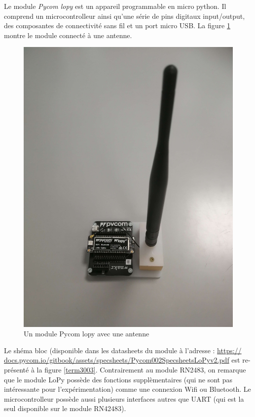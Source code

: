 Le module \textit{Pycom lopy}\cite{sitepycom} est un appareil programmable en micro python. Il comprend un microcontrolleur ainsi qu'une série de pins digitaux input/output,  des composantes de connectivité sans fil et un port micro USB. La figure \ref{term35} montre le module  connecté à une antenne.

\newpage

\begin{figure}[h]
\centering

\includegraphics[scale=0.08]{images/lopy.png}
\caption{Un module Pycom lopy avec une antenne}\label{term35}
\end{figure}


Le shéma bloc (disponible dans les datasheets du module à l'adresse : \href{https://docs.pycom.io/gitbook/assets/specsheets/Pycom_002_Specsheets_LoPy_v2.pdf}{https://
docs.pycom.io/gitbook/assets/specsheets/Pycom002SpecsheetsLoPyv2.pdf} est re-
présenté à la figure \ref{term3003}. Contrairement au module RN2483, on remarque que le module LoPy possède des fonctions supplèmentaires 
(qui ne sont pas intéressante pour l'expérimentation) comme une connexion Wifi ou Bluetooth. Le microcontrolleur possède aussi plusieurs interfaces autres que UART (qui est la seul disponible sur le module RN42483).

